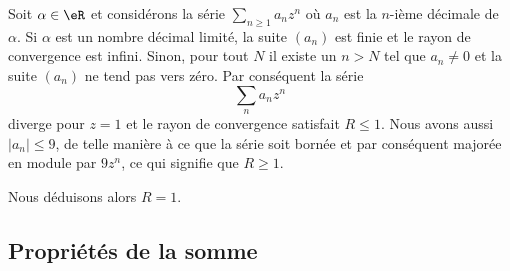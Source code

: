 \begin{example}
    Soit \( \alpha\in \eR\) et considérons la série \( \sum_{n\geq 1}a_nz^n\) où \( a_n\) est la \( n\)-ième décimale de \( \alpha\). Si \( \alpha\) est un nombre décimal limité, la suite \( (a_n)\) est finie et le rayon de convergence est infini. Sinon, pour tout \( N\) il existe un \( n>N\) tel que \( a_n\neq 0\) et la suite \( (a_n)\) ne tend pas vers zéro. Par conséquent la série
    \begin{equation}
        \sum_{n}a_nz^n
    \end{equation}
    diverge pour \( z=1\) et le rayon de convergence satisfait \( R\leq 1\). Nous avons aussi \( | a_n |\leq 9\), de telle manière à ce que la série soit bornée et par conséquent majorée en module par \( 9z^n\), ce qui signifie que \( R\geq 1\). 

    Nous déduisons alors \( R=1\).
\end{example}


\subsection{Propriétés de la somme}

